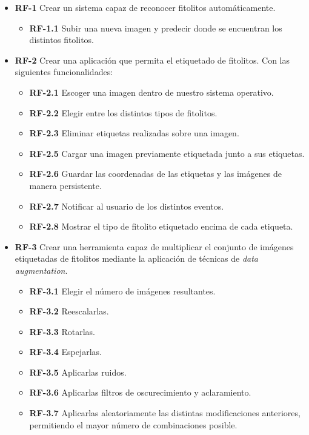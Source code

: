 \begin{itemize}
	\item \textbf{RF-1} Crear un sistema capaz de reconocer fitolitos automáticamente.
	\begin{itemize}
		\item \textbf{RF-1.1} Subir una nueva imagen y predecir donde se encuentran los distintos fitolitos.	\end{itemize}
	\item \textbf{RF-2} Crear una aplicación que permita el etiquetado de fitolitos. Con las siguientes funcionalidades:
	\begin{itemize}
		\item \textbf{RF-2.1} Escoger una imagen dentro de nuestro sistema operativo.
		\item \textbf{RF-2.2} Elegir entre los distintos tipos de fitolitos.
		\item \textbf{RF-2.3} Eliminar etiquetas realizadas sobre una imagen.
		\item \textbf{RF-2.5} Cargar una imagen previamente etiquetada junto a sus etiquetas.
		\item \textbf{RF-2.6} Guardar las coordenadas de las etiquetas y las imágenes de manera persistente.
		\item \textbf{RF-2.7} Notificar al usuario de los distintos eventos.
		\item \textbf{RF-2.8} Mostrar el tipo de fitolito etiquetado encima de cada etiqueta.
	\end{itemize}
	\item \textbf{RF-3} Crear una herramienta capaz de multiplicar el conjunto de imágenes etiquetadas de fitolitos mediante la aplicación de técnicas de \textit{data augmentation}.
	\begin{itemize}
		\item \textbf{RF-3.1} Elegir el número de imágenes resultantes.
		\item \textbf{RF-3.2} Reescalarlas.		
		\item \textbf{RF-3.3} Rotarlas.
		\item \textbf{RF-3.4} Espejarlas.
		\item \textbf{RF-3.5} Aplicarlas ruidos.
		\item \textbf{RF-3.6} Aplicarlas filtros de oscurecimiento y aclaramiento.
		\item \textbf{RF-3.7} Aplicarlas aleatoriamente las distintas modificaciones anteriores, permitiendo el mayor número de combinaciones posible.
	\end{itemize}
\end{itemize}


